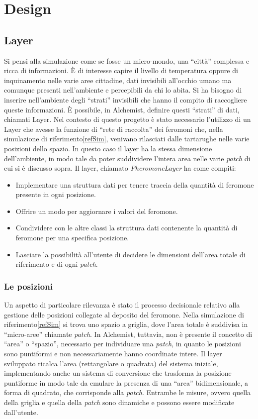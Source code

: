 \chapter{Design}
\section{Layer}
Si pensi alla simulazione come se fosse un micro-mondo, una ``città'' complessa
e ricca di informazioni. È di interesse capire il livello di temperatura oppure di inquinamento nelle varie aree cittadine, dati invisibili
all'occhio umano ma comunque presenti nell'ambiente e percepibili da chi lo abita. Si ha bisogno
di inserire nell'ambiente degli ``strati'' invisibili che hanno il compito di raccogliere queste informazioni.
È possibile, in Alchemist, definire questi ``strati'' di dati, chiamati Layer.
\newline
Nel contesto di questo progetto è stato necessario l'utilizzo di un Layer che avesse la funzione di ``rete di raccolta''
dei feromoni che, nella simulazione di riferimento\space\ref{refSim}, venivano rilasciati dalle tartarughe nelle varie posizioni
dello spazio. In questo caso il layer ha la stessa dimensione dell'ambiente, in modo tale da poter suddividere l'intera area nelle varie \textit{patch} di cui si 
è discusso sopra.
Il layer, chiamato \textit{PheromoneLayer} ha come compiti:
\begin{itemize}
    \item Implementare una struttura dati per tenere traccia della quantità di feromone presente in ogni posizione.
    \item Offrire un modo per aggiornare i valori del feromone.
    \item Condividere con le altre classi la struttura dati contenente la quantità di feromone per una specifica posizione.
    \item Lasciare la possibilità all'utente di decidere le dimensioni dell'area totale di riferimento e di ogni \textit{patch}.
\end{itemize}

\subsection{Le posizioni}
Un aspetto di particolare rilevanza è stato il processo decisionale relativo alla gestione delle posizioni collegate 
al deposito del feromone. Nella simulazione di riferimento\space\ref{refSim} si trova uno spazio a griglia, dove l'area totale è suddivisa
in ``micro-aree'' chiamate \textit{patch}. In Alchemist, tuttavia, non è presente il concetto di ``area'' o ``spazio'', necessario per individuare una \textit{patch},
in quanto le posizioni sono puntiformi e non necessariamente hanno coordinate intere. Il layer sviluppato ricalca l'area (rettangolare o quadrata) del sistema iniziale,
implementando anche un sistema di conversione che trasforma la posizione puntiforme in modo tale da emulare la presenza di una ``area'' bidimensionale, a forma di quadrato, che corrisponde alla \textit{patch}.
Entrambe le misure, ovvero quella della griglia e quella della \textit{patch} sono dinamiche e possono essere modificate dall'utente.
\clearpage

